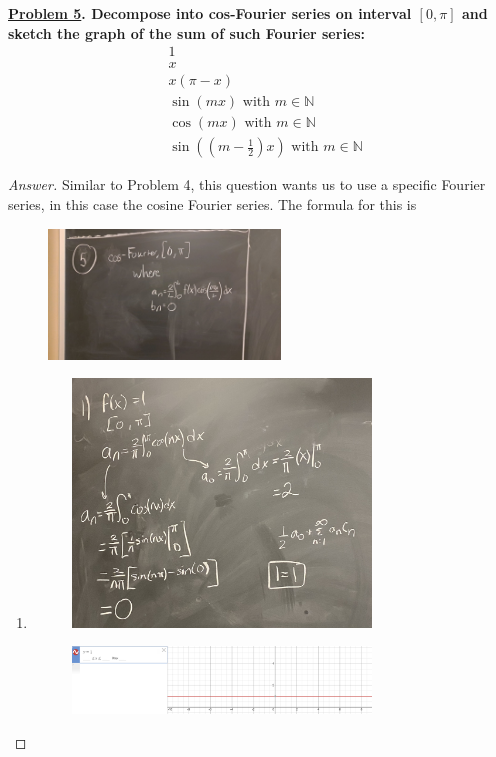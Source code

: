 \documentclass{article}
\theoremstyle{definition}
\renewcommand\qedsymbol{$\blacksquare$}
\newenvironment{ans}{\begin{proof}[Answer]\renewcommand{\qedsymbol}{}}{\end{proof}}
\newenvironment{boldenv}{\bfseries\boldmath}{}
\newcommand{\N}{\mathbb{N}}
\begin{document}
\begin{boldenv}
    \underline{Problem 5}. Decompose into cos-Fourier series on interval $[0, \pi]$ and sketch the graph of the sum of such Fourier series: \begin{align}
        & 1\\
        & x\\
        & x(\pi - x)\\
        & \sin(mx) \text{ with } m \in \N\\
        & \cos(mx) \text{ with } m \in \N\\
        & \sin((m - \frac{1}{2})x) \text{ with } m \in \N
    \end{align}
\end{boldenv}
\begin{ans}
Similar to Problem 4, this question wants us to use a specific Fourier series, in this case the cosine Fourier series. The formula for this is
\begin{figure}[H]
\centering
\includegraphics[width = 0.55\textwidth]{Problem 5 format.jpeg}
\end{figure}
    \begin{enumerate}
        \item \phantom{.} \begin{figure}[H]
\centering
\includegraphics[width = 0.75\textwidth]{Problem 5-1.jpg}
\end{figure}
\begin{figure}
    \centering
    \includegraphics[width = 0.75\textwidth]{Problem 5.1.png}
\end{figure}


\end{enumerate}
\end{ans}
\end{document}
